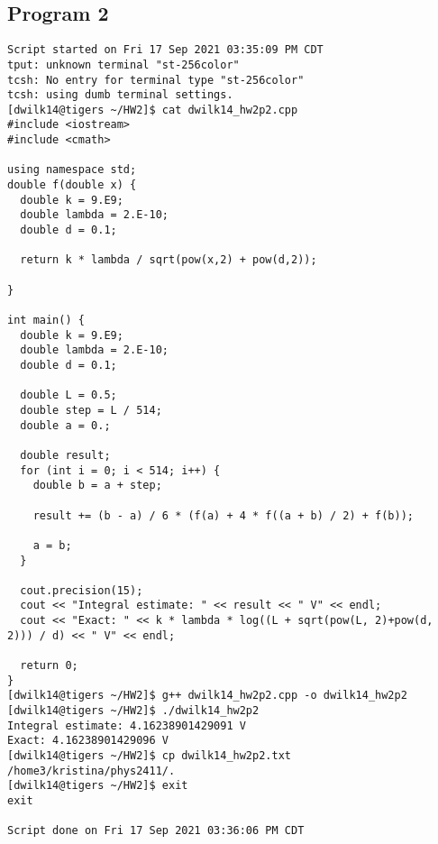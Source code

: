 \documentclass{article}
\begin{document}
\subsection*{Program 2}
\begin{verbatim}
Script started on Fri 17 Sep 2021 03:35:09 PM CDT
tput: unknown terminal "st-256color"
tcsh: No entry for terminal type "st-256color"
tcsh: using dumb terminal settings.
[dwilk14@tigers ~/HW2]$ cat dwilk14_hw2p2.cpp
#include <iostream>
#include <cmath>

using namespace std;
double f(double x) {
  double k = 9.E9;
  double lambda = 2.E-10;
  double d = 0.1;

  return k * lambda / sqrt(pow(x,2) + pow(d,2));

}

int main() {
  double k = 9.E9;
  double lambda = 2.E-10;
  double d = 0.1;

  double L = 0.5;
  double step = L / 514;
  double a = 0.;

  double result;
  for (int i = 0; i < 514; i++) {
    double b = a + step;

    result += (b - a) / 6 * (f(a) + 4 * f((a + b) / 2) + f(b));

    a = b;
  }

  cout.precision(15);
  cout << "Integral estimate: " << result << " V" << endl;
  cout << "Exact: " << k * lambda * log((L + sqrt(pow(L, 2)+pow(d, 2))) / d) << " V" << endl;

  return 0;
}
[dwilk14@tigers ~/HW2]$ g++ dwilk14_hw2p2.cpp -o dwilk14_hw2p2
[dwilk14@tigers ~/HW2]$ ./dwilk14_hw2p2
Integral estimate: 4.16238901429091 V
Exact: 4.16238901429096 V
[dwilk14@tigers ~/HW2]$ cp dwilk14_hw2p2.txt /home3/kristina/phys2411/.
[dwilk14@tigers ~/HW2]$ exit
exit

Script done on Fri 17 Sep 2021 03:36:06 PM CDT

\end{verbatim}
\end{document}
